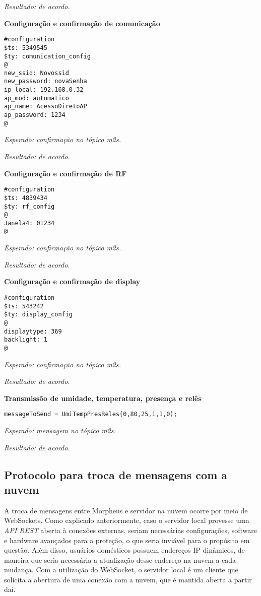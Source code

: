 \emph{Resultado: de acordo.}

\textbf{Configuração e confirmação de comunicação}
\begin{lstlisting}
#configuration
$ts: 5349545
$ty: comunication_config
@
new_ssid: Novossid
new_password: novaSenha
ip_local: 192.168.0.32
ap_mod: automatico
ap_name: AcessoDiretoAP
ap_password: 1234
@
\end{lstlisting}

\emph{Esperado: confirmação no tópico \wmqtt{} m2s.}

\emph{Resultado: de acordo.}

\textbf{Configuração e confirmação de RF}
\begin{lstlisting}
#configuration
$ts: 4839434
$ty: rf_config
@
Janela4: 01234
@
\end{lstlisting}

\emph{Esperado: confirmação no tópico \wmqtt{} m2s.}

\emph{Resultado: de acordo.}

\textbf{Configuração e confirmação de display}
\begin{lstlisting}
#configuration
$ts: 543242
$ty: display_config
@
displaytype: 369
backlight: 1
@
\end{lstlisting}

\emph{Esperado: confirmação no tópico \wmqtt{} m2s.}

\emph{Resultado: de acordo.}

\textbf{Transmissão de umidade, temperatura, presença e relês}
\begin{lstlisting}
messageToSend = UmiTempPresReles(0,80,25,1,1,0);
\end{lstlisting}

\emph{Esperado: mensagem no tópico \wmqtt{} m2s.}

\emph{Resultado: de acordo.}

\subsection{Protocolo para troca de mensagens com a nuvem}
A troca de mensagens entre Morpheus e servidor na nuvem ocorre por meio de WebSockets. Como explicado anteriormente, caso o servidor local provesse uma \emph{API REST} aberta à conexões externas, seriam necessárias configurações, software e hardware avançados para a proteção, o que seria inviável para o propósito em questão. Além disso, usuários domésticos possuem endereços IP dinâmicos, de maneira que seria necessária a atualização desse endereço na nuvem a cada mudança. Com a utilização do WebSocket, o servidor local é um cliente que solicita a abertura de uma conexão com a nuvem, que é mantida aberta a partir daí.

